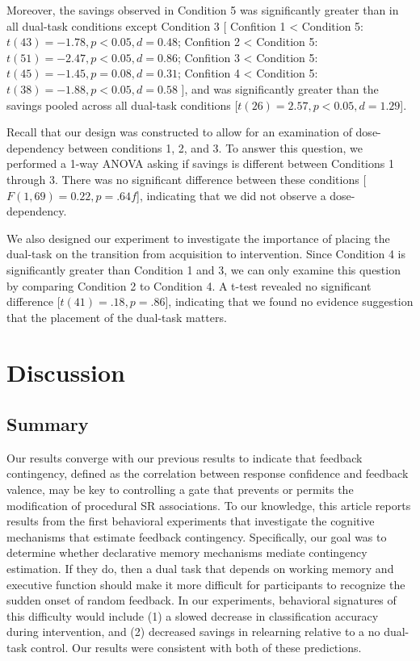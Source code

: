 \documentclass[man,apacite,draftfirst]{apa6}
\begin{document}
Moreover, the savings observed in Condition 5 was significantly greater than in
all dual-task conditions except Condition 3
[
Confition 1 < Condition 5: $t(43) = -1.78, p < 0.05, d = 0.48$;
Confition 2 < Condition 5: $t(51) = -2.47, p < 0.05, d = 0.86$;
Confition 3 < Condition 5: $t(45) = -1.45, p = 0.08, d = 0.31$;
Confition 4 < Condition 5: $t(38) = -1.88, p < 0.05, d = 0.58$
], and was significantly greater than the savings pooled across all dual-task
conditions [$t(26) = 2.57, p < 0.05, d = 1.29$].

Recall that our design was constructed to allow for an examination of
dose-dependency between conditions 1, 2, and 3. To answer this question, we
performed a 1-way ANOVA asking if savings is different between Conditions 1
through 3. There was no significant difference between these conditions
[$F(1,69) = 0.22, p = .64f$], indicating that we did not observe a
dose-dependency.

We also designed our experiment to investigate the importance of placing the
dual-task on the transition from acquisition to intervention. Since Condition 4
is significantly greater than Condition 1 and 3, we can only examine this
question by comparing Condition 2 to Condition 4. A t-test revealed no
significant difference [$t(41) = .18, p = .86$], indicating that we found no
evidence suggestion that the placement of the dual-task matters.

\section*{Discussion}
\subsection*{Summary}
Our results converge with our previous results \cite{crossley_erasing_2013} to
indicate that feedback contingency, defined as the correlation between response
confidence and feedback valence, may be key to controlling a gate that prevents
or permits the modification of procedural SR associations. To our knowledge,
this article reports results from the first behavioral experiments that
investigate the cognitive mechanisms that estimate feedback contingency.
Specifically, our goal was to determine whether declarative memory mechanisms
mediate contingency estimation. If they do, then a dual task that depends on
working memory and executive function should make it more difficult for
participants to recognize the sudden onset of random feedback. In our
experiments, behavioral signatures of this difficulty would include (1) a slowed
decrease in classification accuracy during intervention, and (2) decreased
savings in relearning relative to a no dual-task control. Our results were
consistent with both of these predictions.
\end{document}
